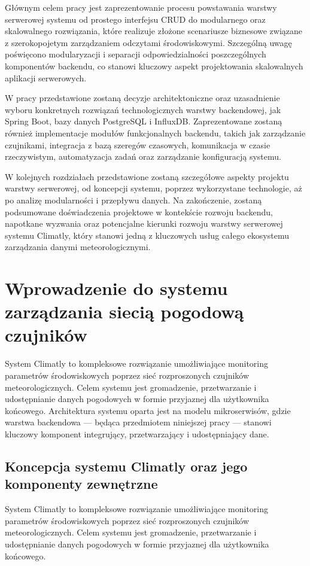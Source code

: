 \documentclass[a4paper,12pt,openany]{book}
\begin{document}
Głównym celem pracy jest zaprezentowanie procesu powstawania warstwy serwerowej systemu od prostego interfejsu CRUD do modularnego oraz skalowalnego rozwiązania, które realizuje złożone scenariusze biznesowe związane z szerokopojetym zarządzaniem odczytami środowiskowymi. Szczególną uwagę poświęcono modularyzacji i separacji odpowiedzialności poszczególnych komponentów backendu, co stanowi kluczowy aspekt projektowania skalowalnych aplikacji serwerowych.

W pracy przedstawione zostaną decyzje architektoniczne oraz uzasadnienie wyboru konkretnych rozwiązań technologicznych warstwy backendowej, jak Spring Boot, bazy danych PostgreSQL i InfluxDB. Zaprezentowane zostaną również implementacje modułów funkcjonalnych backendu, takich jak zarządzanie czujnikami, integracja z bazą szeregów czasowych, komunikacja w czasie rzeczywistym, automatyzacja zadań oraz zarządzanie konfiguracją systemu.

W kolejnych rozdziałach przedstawione zostaną szczegółowe aspekty projektu warstwy serwerowej, od koncepcji systemu, poprzez wykorzystane technologie, aż po analizę modularności i przepływu danych. Na zakończenie, zostaną podsumowane doświadczenia projektowe w kontekście rozwoju backendu, napotkane wyzwania oraz potencjalne kierunki rozwoju warstwy serwerowej systemu Climatly, który stanowi jedną z kluczowych usług całego ekosystemu zarządzania danymi meteorologicznymi.

\chapter{Wprowadzenie do systemu zarządzania siecią pogodową czujników}

System Climatly to kompleksowe rozwiązanie umożliwiające monitoring parametrów środowiskowych poprzez sieć rozproszonych czujników meteorologicznych. Celem systemu jest gromadzenie, przetwarzanie i udostępnianie danych pogodowych w formie przyjaznej dla użytkownika końcowego. Architektura systemu oparta jest na modelu mikroserwisów, gdzie warstwa backendowa --- będąca przedmiotem niniejszej pracy --- stanowi kluczowy komponent integrujący, przetwarzający i udostępniający dane.

\section{Koncepcja systemu Climatly oraz jego komponenty zewnętrzne}

System Climatly to kompleksowe rozwiązanie umożliwiające monitoring parametrów środowiskowych poprzez sieć rozproszonych czujników meteorologicznych. Celem systemu jest gromadzenie, przetwarzanie i udostępnianie danych pogodowych w formie przyjaznej dla użytkownika końcowego.
\end{document}
